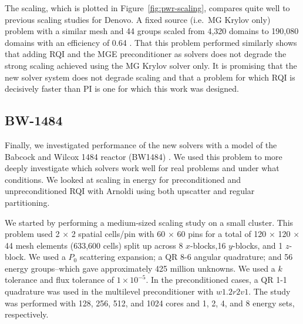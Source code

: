 \documentclass{article}                                                                           %
\begin{document}
The scaling, which is plotted in Figure~\ref{fig:pwr-scaling}, compares quite well to previous scaling studies for Denovo. A fixed source (i.e.\ MG Krylov only) problem with a similar mesh and 44 groups scaled from 4,320 domains to 190,080 domains with an efficiency of 0.64 \cite{Slaybaugh2011}. That this problem performed similarly shows that adding RQI and the MGE preconditioner as solvers does not degrade the strong scaling achieved using the MG Krylov solver only. It is promising that the new solver system does not degrade scaling and that a problem for which RQI is decisively faster than PI is one for which this work was designed. 


\subsection{BW-1484}
Finally, we investigated performance of the new solvers with a model of the Babcock and Wilcox 1484 reactor (BW1484) \cite{bw1484}. We used this problem to more deeply investigate which solvers work well for real problems and under what conditions. We looked at scaling in energy for preconditioned and unpreconditioned RQI with Arnoldi using both upscatter and regular partitioning. 


We started by performing a medium-sized scaling study on a small cluster. This problem used 2 $\times$ 2 spatial cells/pin with 60 $\times$ 60 pins for a total of 120 $\times$ 120 $\times$ 44 mesh elements (633,600 cells) split up across 8 $x$-blocks,16 $y$-blocks, and 1 $z$-block. 
We used a $P_0$ scattering expansion; a QR 8-6 angular quadrature; and 56 energy groups--which gave approximately 425 million unknowns. 
We used a $k$ tolerance and flux tolerance of $1 \times 10^{-5}$.
In the preconditioned cases, a QR 1-1 quadrature was used in the multilevel preconditioner with $w1.2r2v1$. 
The study was performed with 128, 256, 512, and 1024 cores and 1, 2, 4, and 8 energy sets, respectively. 
\end{document}
